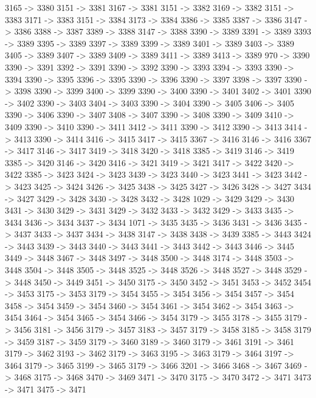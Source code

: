 {	3165 -> 3380
	3151 -> 3381
	3167 -> 3381
	3151 -> 3382
	3169 -> 3382
	3151 -> 3383
	3171 -> 3383
	3151 -> 3384
	3173 -> 3384
	3386 -> 3385
	3387 -> 3386
	3147 -> 3386
	3388 -> 3387
	3389 -> 3388
	3147 -> 3388
	3390 -> 3389
	3391 -> 3389
	3393 -> 3389
	3395 -> 3389
	3397 -> 3389
	3399 -> 3389
	3401 -> 3389
	3403 -> 3389
	3405 -> 3389
	3407 -> 3389
	3409 -> 3389
	3411 -> 3389
	3413 -> 3389
	970 -> 3390
	3390 -> 3391
	3392 -> 3391
	3390 -> 3392
	3390 -> 3393
	3394 -> 3393
	3390 -> 3394
	3390 -> 3395
	3396 -> 3395
	3390 -> 3396
	3390 -> 3397
	3398 -> 3397
	3390 -> 3398
	3390 -> 3399
	3400 -> 3399
	3390 -> 3400
	3390 -> 3401
	3402 -> 3401
	3390 -> 3402
	3390 -> 3403
	3404 -> 3403
	3390 -> 3404
	3390 -> 3405
	3406 -> 3405
	3390 -> 3406
	3390 -> 3407
	3408 -> 3407
	3390 -> 3408
	3390 -> 3409
	3410 -> 3409
	3390 -> 3410
	3390 -> 3411
	3412 -> 3411
	3390 -> 3412
	3390 -> 3413
	3414 -> 3413
	3390 -> 3414
	3416 -> 3415
	3417 -> 3415
	3367 -> 3416
	3146 -> 3416
	3367 -> 3417
	3146 -> 3417
	3419 -> 3418
	3420 -> 3418
	3385 -> 3419
	3146 -> 3419
	3385 -> 3420
	3146 -> 3420
	3416 -> 3421
	3419 -> 3421
	3417 -> 3422
	3420 -> 3422
	3385 -> 3423
	3424 -> 3423
	3439 -> 3423
	3440 -> 3423
	3441 -> 3423
	3442 -> 3423
	3425 -> 3424
	3426 -> 3425
	3438 -> 3425
	3427 -> 3426
	3428 -> 3427
	3434 -> 3427
	3429 -> 3428
	3430 -> 3428
	3432 -> 3428
	1029 -> 3429
	3429 -> 3430
	3431 -> 3430
	3429 -> 3431
	3429 -> 3432
	3433 -> 3432
	3429 -> 3433
	3435 -> 3434
	3436 -> 3434
	3437 -> 3434
	1071 -> 3435
	3435 -> 3436
	3431 -> 3436
	3435 -> 3437
	3433 -> 3437
	3434 -> 3438
	3147 -> 3438
	3438 -> 3439
	3385 -> 3443
	3424 -> 3443
	3439 -> 3443
	3440 -> 3443
	3441 -> 3443
	3442 -> 3443
	3446 -> 3445
	3449 -> 3448
	3467 -> 3448
	3497 -> 3448
	3500 -> 3448
	3174 -> 3448
	3503 -> 3448
	3504 -> 3448
	3505 -> 3448
	3525 -> 3448
	3526 -> 3448
	3527 -> 3448
	3529 -> 3448
	3450 -> 3449
	3451 -> 3450
	3175 -> 3450
	3452 -> 3451
	3453 -> 3452
	3454 -> 3453
	3175 -> 3453
	3179 -> 3454
	3455 -> 3454
	3456 -> 3454
	3457 -> 3454
	3458 -> 3454
	3459 -> 3454
	3460 -> 3454
	3461 -> 3454
	3462 -> 3454
	3463 -> 3454
	3464 -> 3454
	3465 -> 3454
	3466 -> 3454
	3179 -> 3455
	3178 -> 3455
	3179 -> 3456
	3181 -> 3456
	3179 -> 3457
	3183 -> 3457
	3179 -> 3458
	3185 -> 3458
	3179 -> 3459
	3187 -> 3459
	3179 -> 3460
	3189 -> 3460
	3179 -> 3461
	3191 -> 3461
	3179 -> 3462
	3193 -> 3462
	3179 -> 3463
	3195 -> 3463
	3179 -> 3464
	3197 -> 3464
	3179 -> 3465
	3199 -> 3465
	3179 -> 3466
	3201 -> 3466
	3468 -> 3467
	3469 -> 3468
	3175 -> 3468
	3470 -> 3469
	3471 -> 3470
	3175 -> 3470
	3472 -> 3471
	3473 -> 3471
	3475 -> 3471
}
